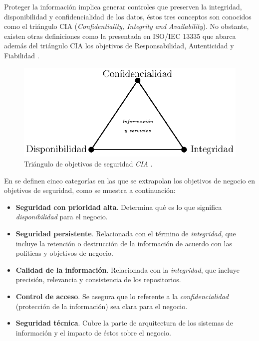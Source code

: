 Proteger la información implica generar controles que preserven la integridad, disponibilidad y confidencialidad de los datos, éstos tres conceptos son conocidos como el triángulo CIA (\textit{Confidentiality, Integrity and Availability}). No obstante, existen otras definiciones como la presentada en ISO/IEC 13335 que abarca además del triángulo CIA los objetivos de Responsabilidad, Autenticidad y Fiabilidad \cite{Val19}.

\begin{figure}[h!]
  \centering
    \includegraphics[scale=1]{Imagenes/ciaObj.eps}
    \caption{Triángulo de objetivos de seguridad \textit{CIA} \cite{Sta11}.}
    \label{diagrama-tr1}
\end{figure}	

\vspace{0.3cm}

En \cite{Ace1709} se definen cinco categorías en las que se extrapolan los objetivos de negocio en objetivos de seguridad, como se muestra a continuación:

\begin{itemize}[noitemsep]
	\item \textbf{Seguridad con prioridad alta}. Determina qué es lo que significa \textit{disponibilidad} para el negocio.
	\item \textbf{Seguridad persistente}. Relacionada con el término de \textit{integridad}, que incluye la retención o destrucción de la información de acuerdo con las políticas y objetivos de negocio.
	\item \textbf{Calidad de la información}. Relacionada con la \textit{integridad}, que incluye precisión, relevancia y consistencia de los repositorios. 
	\item \textbf{Control de acceso}. Se asegura que lo referente a la \textit{confidencialidad} (protección de la información) sea clara para el negocio. 
	\item \textbf{Seguridad técnica}. Cubre la parte de arquitectura de los sistemas de información y el impacto de éstos sobre el negocio. 
\end{itemize}



